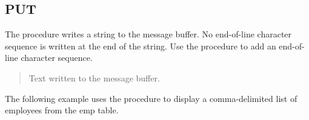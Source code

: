 \documentclass[letterpaper,10pt,english,openany,oneside]{sphinxmanual}
\begin{document}
\subsection{PUT}
\label{\detokenize{dbms_output:put}}\label{\detokenize{dbms_output:index-7}}
The  procedure writes a string to the message buffer. No end-of-line
character sequence is written at the end of the string. Use the
 procedure to add an end-of-line character sequence.
\begin{quote}

\end{quote}


\begin{quote}

Text written to the message buffer.
\end{quote}


The following example uses the  procedure to display a
comma-delimited list of employees from the emp table.
\end{document}
